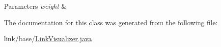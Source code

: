 \begin{DoxyParams}{Parameters}
{\em weight} & \\
\hline
\end{DoxyParams}


The documentation for this class was generated from the following file\+:\begin{DoxyCompactItemize}
\item 
link/base/\hyperlink{_link_visualizer_8java}{Link\+Visualizer.\+java}\end{DoxyCompactItemize}
